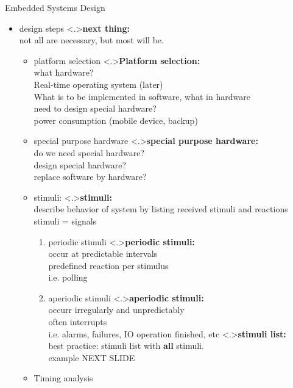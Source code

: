 \documentclass[ngerman={babel}, utf8, bigger, t, xcolor={table,dvipsnames}, ompress, hyperref={bookmarks,colorlinks}]{beamer}
\begin{document}
\begin{frame}{Embedded Systems Design}
	\begin{itemize}
		\item design steps
		\note<.>{\textbf{next thing:}\\ not all are necessary, but most will be.}
		\begin{itemize}
			\item platform selection
			\note<.>{\textbf{Platform selection:}\\ what hardware? \\ Real-time operating system {\tiny (later)}\\ What is to be implemented in software, what in hardware \\ need to design special hardware? \\ power consumption (mobile device, backup)}
			\item special purpose hardware
			\note<.>{\textbf{special purpose hardware:}\\ do we need special hardware? \\ design special hardware? \\ replace software by hardware?}
			\item stimuli:
			\note<.>{\textbf{stimuli:}\\ describe behavior of system by listing received stimuli and reactions \\ stimuli = signals \\}
				\begin{enumerate}
					\item periodic stimuli
					\note<.>{\textbf{periodic stimuli:}\\occur at predictable intervals \\ predefined reaction per stimulus \\ i.e. polling}
					\item aperiodic stimuli
					\note<.>{\textbf{aperiodic stimuli:}\\ occurr irregularly and unpredictably \\ often interrupts \\ i.e. alarms, failures, IO operation finished, etc}
					\note<.>{\textbf{stimuli list:}\\best practice: stimuli list with \textbf{all} stimuli. \\ \vspace*{2em} example NEXT SLIDE}
				\end{enumerate}
			\item Timing analysis

\end{itemize}
\end{itemize}
\end{frame}
\end{document}
